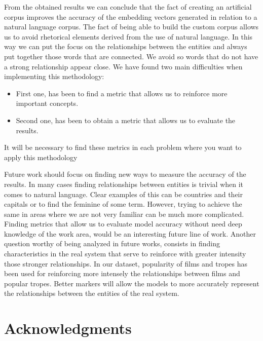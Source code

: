 \documentclass[letterpaper]{article}
\begin{document}
	From the obtained results we can conclude that the fact of creating an artificial corpus improves the accuracy of the embedding vectors generated in relation to a natural language  corpus. The fact of being able to build the custom corpus allows us to avoid rhetorical elements derived from the use of natural language. In this way we can put the focus on the relationships between the entities and always put together those words that are connected. We avoid so words that do not have a strong relationship appear close. 
	We have found two main difficulties when implementing this methodology:
	\begin{itemize}
	\item First one, has been to find a metric that allows us to reinforce more important concepts. 
	\item Second one, has been to obtain a metric that allows us to evaluate the results.
    \end{itemize}
	It will be necessary to find these metrics in each problem where you want to apply this methodology
	
	Future work should focus on finding new ways to measure the accuracy of the results. In many cases finding relationships between entities is trivial when it comes to natural language. Clear examples of this can be countries and their capitals or to find the feminine of some term. However, trying to achieve the same in areas where we are not very familiar can be much more complicated. Finding metrics that allow us to evaluate model accuracy without need deep knowledge of the work area, would be an interesting future line of work. Another question worthy of being analyzed in future works, consists in finding characteristics in the real system that serve to reinforce with greater intensity those stronger relationships. In our dataset, popularity of films and tropes has been used for reinforcing more intensely the relationships between films and popular tropes. Better markers will allow the models to more accurately represent the relationships between the entities of the real system.
	
	
	
	\section{Acknowledgments}
	
	
	
	
\end{document}
